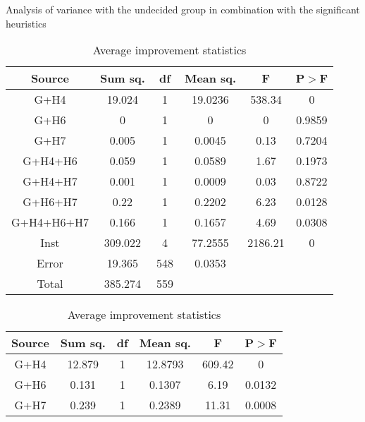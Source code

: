 \documentclass[../main.tex]{subfiles}
\begin{document}
\begin{table}
    \centering
    \caption{Analysis of variance with the undecided group in combination with the significant heuristics}
    \begin{adjustbox}{width=\columnwidth,center}
        \begin{subtable}{.75\columnwidth}
            \centering
            \begin{tabular}{cccccc}
            \hline
            Source  &Sum sq.    &df &Mean sq.   &F      &P$>$F \\ 
            \hline
            G+H4        & 19.024    & 1 & 19.0236   & 538.34& 0     \\
            G+H6        & 0         & 1 & 0         & 0     & 0.9859\\
            G+H7        & 0.005     & 1 & 0.0045    & 0.13  & 0.7204\\
            G+H4+H6     & 0.059     & 1 & 0.0589    & 1.67  & 0.1973\\
            G+H4+H7     & 0.001     & 1 & 0.0009    & 0.03  & 0.8722\\
            G+H6+H7     & 0.22      & 1 & 0.2202    & 6.23  & 0.0128\\
            G+H4+H6+H7  & 0.166     & 1 & 0.1657    & 4.69  & 0.0308\\
            Inst        & 309.022   & 4 & 77.2555   &2186.21& 0     \\
            Error       & 19.365    &548& 0.0353    &       &       \\
            Total       & 385.274   &559&           &       &       \\
            \hline
            \end{tabular}
        \caption{Average improvement statistics}
        \label{tab:anovaAvrgGroup}
        \end{subtable}
        \hfill
        \begin{subtable}{.85\columnwidth}
            \centering
            \begin{tabular}{cccccc}
            \hline
            Source  &Sum sq.    &df &Mean sq.   &F      &P$>$F \\ 
            \hline
            G+H4        & 12.879    & 1 & 12.8793   & 609.42& 0     \\
            G+H6        & 0.131     & 1 & 0.1307    & 6.19  & 0.0132\\
            G+H7        & 0.239     & 1 & 0.2389    & 11.31 & 0.0008\\

\end{tabular}
\end{subtable}
\end{adjustbox}
\end{table}
\end{document}
